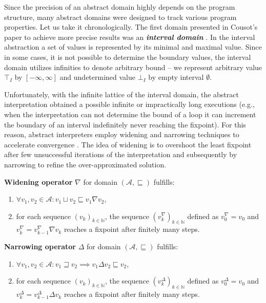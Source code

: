 Since the precision of an abstract domain highly depends on the program
structure, many abstract domains were designed to track various program
properties. Let us take it chronologically. The first domain presented in
Cousot's paper \cite{Cousot1977} to achieve more precise results was an
\textbf{\emph{interval domain}} . In the interval abstraction a set of values
is represented by its minimal and maximal value. Since in some cases, it is not
possible to determine the boundary values, the interval domain utilizes
infinities to denote arbitrary bound -- we represent arbitrary value
$\top_{\textit{I}}$ by $[-\infty, \infty]$ and undetermined value $\bot_{\textit{I}}$
by empty interval $\emptyset$.

Unfortunately, with the infinite lattice of the interval
domain, the
abstract interpretation obtained a possible infinite or impractically long
executions (e.g., when the interpretation can not determine the bound of a loop
it can increment the boundary of an interval indefinitely never reaching the
fixpoint). For this reason, abstract interpreters employ widening and
narrowing techniques to accelerate convergence \cite{Cousot1992a, Cortesi2011}.
The idea of widening is to overshoot the least fixpoint after few
unsuccessful iterations of the interpretation and subsequently by narrowing to
refine the over-approximated solution.
\begin{definition}
    \textbf{Widening operator} $\nabla$ for domain $(\mathcal{A},
    \sqsubseteq)$ fulfills:
    \begin{enumerate}
        \item $\forall v_1, v_2 \in \mathcal{A} : v_1 \sqcup v_2 \sqsubseteq v_1 \nabla v_2$,
        \item for each sequence $(v_k)_{k \in \mathbb{N}}$, the sequence $(v^{\nabla}_k)_{k \in \mathbb{N}}$ defined as $v^{\nabla}_0 = v_0$ and $v^{\nabla}_k = v^{\nabla}_{k-1} \nabla v_k$ reaches a fixpoint after finitely many steps.
    \end{enumerate}
\end{definition}
\begin{definition}
    \textbf{Narrowing operator} $\Delta$ for domain $(\mathcal{A},
    \sqsubseteq)$ fulfills:
    \begin{enumerate}
        \item $\forall v_1, v_2 \in \mathcal{A} : v_1 \sqsupseteq v_2 \implies v_1 \Delta v_2 \sqsubseteq v_2$,
        \item for each sequence $(v_k)_{k \in \mathbb{N}}$, the sequence $(v^{\Delta}_k)_{k \in \mathbb{N}}$ defined as $v^{\Delta}_0 = v_0$ and $v^{\Delta}_k = v^{\Delta}_{k-1} \Delta v_k$ reaches a fixpoint after finitely many steps.
    \end{enumerate}
\end{definition}

